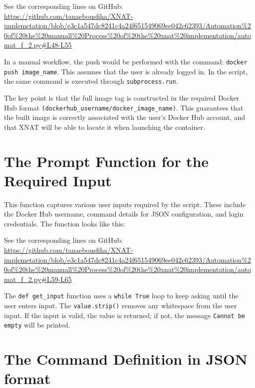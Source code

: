 \noindent\footnotesize See the corresponding lines on GitHub:\url{ https://github.com/tanaebousfiha/XNAT-implemetation/blob/e3c1a547dc8241c4a24f651549069ee042c62393/Automation%20of%20the%20manuall%20Process%20of%20the%20xnat%20implementation/automat_f_2.py#L48-L55}





In a manual workflow, the push would be performed with the command:  \texttt{docker push image\_name}. This assumes that the user is already logged in. In the script, the same command is executed through  \texttt{subprocess.run}.

The key point is that the full image tag is constructed in the required Docker Hub format \texttt{(dockerhub\_username/docker\_image\_name)}. This guarantees that the built image is correctly associated with the user’s Docker Hub account, and that XNAT will be able to locate it when launching the container.

\section{The Prompt Function for the Required Input}

This function captures various user inputs required by the script. These include the Docker Hub username, command details for JSON configuration, and login credentials.
The function looks like this:
 


\noindent\footnotesize See the corresponding lines on GitHub:\url{ https://github.com/tanaebousfiha/XNAT-implemetation/blob/e3c1a547dc8241c4a24f651549069ee042c62393/Automation%20of%20the%20manuall%20Process%20of%20the%20xnat%20implementation/automat_f_2.py#L59-L65}


The \texttt{def get\_input} function uses a \texttt{while True} loop to keep asking until the user enters input. The \texttt{value.strip()} removes any whitespace from the user input. If the input is valid, the value is returned; if not, the message \texttt{Cannot be empty} will be printed.

\section{The Command Definition in JSON format}

